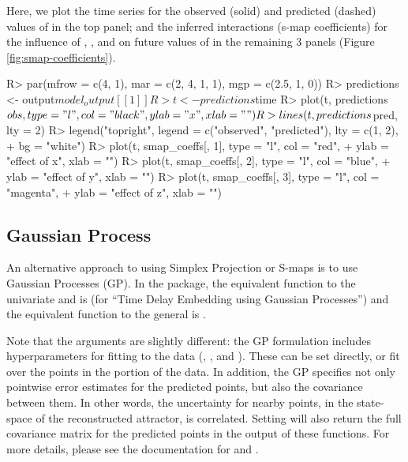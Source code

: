 \documentclass[article]{jss}
\begin{document}
Here, we plot the time series for the observed (solid) and predicted (dashed) values of  in the top panel; and the inferred interactions (s-map coefficients) for the influence of , , and  on future values of  in the remaining 3 panels (Figure \ref{fig:smap-coefficients}).

\begin{Schunk}
\begin{Sinput}
R> par(mfrow = c(4, 1), mar = c(2, 4, 1, 1), mgp = c(2.5, 1, 0))
R> predictions <- output$model_output[[1]]
R> t <- predictions$time
R> plot(t, predictions$obs, type = "l", col = "black", ylab = "x", xlab = "")
R> lines(t, predictions$pred, lty = 2)
R> legend("topright", legend = c("observed", "predicted"), lty = c(1, 2), 
+         bg = "white")
R> plot(t, smap_coeffs[, 1], type = "l", col = "red", 
+       ylab = "effect of x", xlab = "")
R> plot(t, smap_coeffs[, 2], type = "l", col = "blue", 
+       ylab = "effect of y", xlab = "")
R> plot(t, smap_coeffs[, 3], type = "l", col = "magenta", 
+       ylab = "effect of z", xlab = "")
\end{Sinput}
\end{Schunk}

\subsection{Gaussian Process}\label{sec:gaussian-processes}

An alternative approach to using Simplex Projection or S-maps is to use Gaussian Processes (GP). In the  package, the equivalent function to the univariate  and  is  (for ``Time Delay Embedding using Gaussian Processes'') and the equivalent function to the general  is .

Note that the arguments are slightly different: the GP formulation includes hyperparameters for fitting to the data (, , and ). These can be set directly, or fit over the points in the  portion of the data. In addition, the GP specifies not only pointwise error estimates for the predicted points, but also the covariance between them. In other words, the uncertainty for nearby points, in the state-space of the reconstructed attractor, is correlated. Setting  will also return the full covariance matrix for the predicted points in the output of these functions. For more details, please see the documentation for  and .
\end{document}
